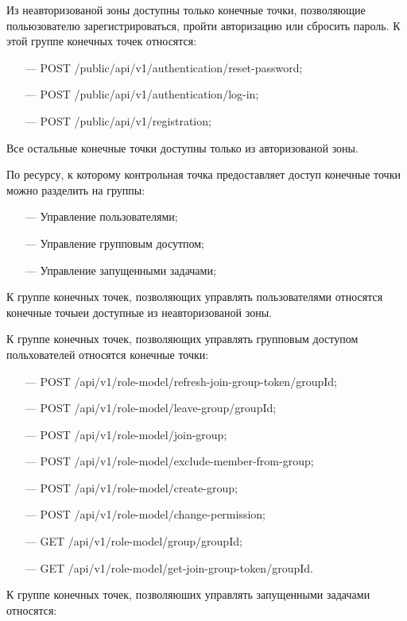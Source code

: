 Из неавторизованой зоны доступны только конечные точки, позволяющие польюзователю зарегистрироваться, пройти авторизацию или сбросить пароль.
К этой группе конечных точек относятся:

\begin{itemize}
  \item[---] POST /public/api/v1/authentication/reset-password;
  \item[---] POST /public/api/v1/authentication/log-in;
  \item[---] POST /public/api/v1/registration;
\end{itemize}

Все остальные конечные точки доступны только из авторизованой зоны.

По ресурсу, к которому контрольная точка предоставляет доступ конечные точки можно разделить на группы:

\begin{itemize}
  \item[---] Управление пользователями;
  \item[---] Управление групповым досутпом;
  \item[---] Управление запущенными задачами;
\end{itemize}

К группе конечных точек, позволяющих управлять пользователями относятся конечные точыеи доступные из неавторизованой зоны.

К группе конечных точек, позволяющих управлять групповым доступом польхователей относятся конечные точки:

\begin{itemize}
  \item[---] POST /api/v1/role-model/refresh-join-group-token/{groupId};
  \item[---] POST /api/v1/role-model/leave-group/{groupId};
  \item[---] POST /api/v1/role-model/join-group;
  \item[---] POST /api/v1/role-model/exclude-member-from-group;
  \item[---] POST /api/v1/role-model/create-group;
  \item[---] POST /api/v1/role-model/change-permission;
  \item[---] GET /api/v1/role-model/group/{groupId};
  \item[---] GET /api/v1/role-model/get-join-group-token/{groupId}.
\end{itemize}

К группе конечных точек, позволяюших управлять запущенными задачами относятся:

